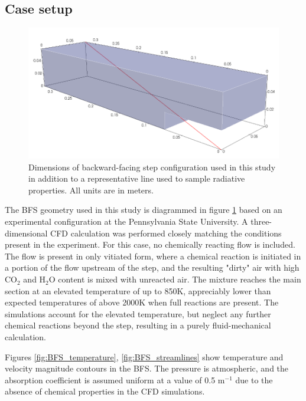 \subsection{Case setup}
\begin{figure}
\includegraphics[width=\linewidth]{figures/ch4/BFS_geometry.png}
\caption{Dimensions of backward-facing step configuration used in this study in addition to a representative line used to sample radiative properties. All units are in meters. }
\label{fig:BFS_geometry}
\end{figure}

The BFS geometry used in this study is diagrammed in figure \ref{fig:BFS_geometry} based on an experimental configuration at the Pennsylvania State University.
A three-dimensional CFD calculation was performed closely matching the conditions present in the experiment. For this case, no chemically reacting flow is included. 
The flow is present in only vitiated form, where a chemical reaction is initiated in a portion of the flow upstream of the step, and the resulting "dirty" air with high CO$_2$ and H$_2$O content is mixed with unreacted air. 
The mixture reaches the main section at an elevated temperature of up to 850K, appreciably lower than expected temperatures of above 2000K when full reactions are present. 
The simulations account for the elevated temperature, but neglect any further chemical reactions beyond the step, resulting in a purely fluid-mechanical calculation.

Figures \ref{fig:BFS_temperature}, \ref{fig:BFS_streamlines} show temperature and velocity magnitude contours in the BFS. The pressure is atmospheric, and the absorption coefficient is assumed uniform at a value of 0.5 m$^{-1}$ due to the absence of chemical properties in the CFD simulations.

